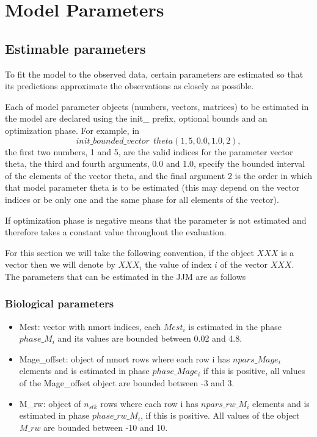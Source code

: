 \documentclass{article}
\begin{document}
\section{Model Parameters}
\subsection{Estimable parameters}
To fit the model to the observed data, certain parameters are estimated so that its predictions approximate the observations as closely as possible.

Each of model parameter objects (numbers, vectors, matrices)  to be estimated in the model are declared using the init\_ prefix, optional bounds and an optimization phase. For example, in
\begin{equation*}
    init\_bounded\_vector \ \ theta(1,5,0.0,1.0,2),
\end{equation*}
the first two numbers, 1 and 5, are the valid indices for the parameter vector theta, the third and fourth arguments, 0.0 and 1.0, specify the bounded interval of the elements of the vector theta, and the final argument 2 is the order in which that model parameter theta is to be estimated (this may depend on the vector indices or be only one and the same phase for all elements of the vector). 

If optimization phase is negative means that the parameter is not estimated and therefore takes a constant value throughout the evaluation.

For this section we will take the following convention, if the object $XXX$ is a vector then we will denote by $XXX_i$ the value of index $i$ of the vector $XXX$. \\


The parameters that can be estimated in the JJM are as follows
\subsubsection{Biological parameters}
\begin{itemize}
    
    \item Mest: vector with nmort indices, each $Mest_i$ is estimated in the phase $phase\_M_i$ and its values are bounded between 0.02 and 4.8.
    

    \item Mage\_offset: object of nmort rows where each row i has $npars\_Mage_i$ elements and is estimated in phase $phase\_Mage_i$ if this is positive, all values of the Mage\_offset object are bounded between -3 and 3.
    
    \item M\_rw: object of $n_{stk}$ rows where each row i has $npars\_rw\_M_i$ elements and is estimated in phase $phase\_rw\_M_i$, if this is positive. All values of the object $M\_rw$ are bounded between -10 and 10.
    
\end{itemize}
\end{document}
